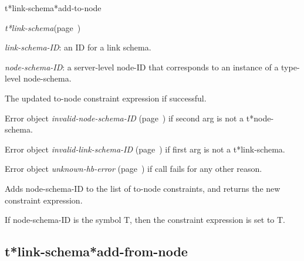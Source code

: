 \begin{description}
\item [Name:]  t*link-schema*add-to-node

\item [Class:] {\sl t*link-schema}\hfill(page~\pageref{t*link-schema})

\item [Parameters:]
\item {\sl link-schema-ID}:  an ID for a link schema.

\item {\sl node-schema-ID}:  a server-level node-ID that corresponds to an 
instance of a type-level node-schema. 



\item [Return-value:]
The updated to-node constraint expression if successful.

Error object {\sl invalid-node-schema-ID} (page~\pageref{invalid-node-schema-ID}) if second
arg is not a t*node-schema.

Error object {\sl invalid-link-schema-ID} (page~\pageref{invalid-link-schema-ID}) if first
arg is not a t*link-schema.

Error object {\sl unknown-hb-error} (page~\pageref{unknown-hb-error}) if call fails for 
any other reason.

\item [Description:]

Adds node-schema-ID to the list of to-node constraints,
and returns the new constraint expression.

If node-schema-ID is the symbol T, then the constraint
expression is set to T.

\item [Public:]



\end{description}
\horizontalline

\subsection{t*link-schema*add-from-node}
\label{t*link-schema*add-from-node}

